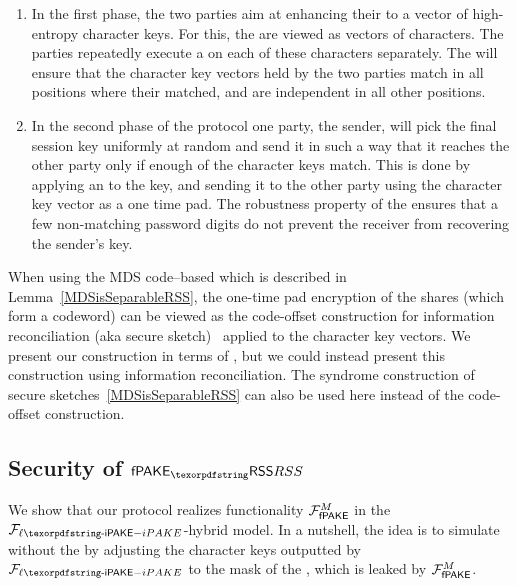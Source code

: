 

% 
\begin{enumerate}
\item 
In the first phase, the two parties aim at enhancing their \passwords to a vector of high-entropy character keys. 
For this, the \passwords are viewed as vectors of characters. 
The parties repeatedly execute a \PAKE on each of these characters separately. 
The \PAKE will ensure that the character key vectors held by the two parties match in all positions where their \passwords matched, and are independent in all other positions. 
\item
In the second phase of the protocol one party, the sender, will pick the final session key uniformly at random and send it in such a way that it reaches the other party only if enough of the character keys match.
This is done by applying an \RSS to the key, and sending it to the other party using the character key vector as a one time pad.
The robustness property of the \RSS ensures that a few non-matching password digits do not prevent the receiver from recovering the sender's key.
\end{enumerate}

When using the MDS code--based \RSS which is described in Lemma~\ref{MDSisSeparableRSS}, the one-time pad encryption of the shares (which form a codeword) can be viewed as the code-offset construction for information reconciliation (aka secure sketch)~\cite{CCS:JueWat99,EC:DodReySmi04} applied to the character key vectors. 
We present our construction in terms of \RSS, but we could instead present this construction using information reconciliation. 
The syndrome construction of secure sketches~\ref{MDSisSeparableRSS} can also be used here instead of the code-offset construction.

\subsection{Security of {$\PfakeRSS$}}\label{sec:secrssfpake}
We show that our protocol realizes functionality $\mathcal{F}_\textsf{fPAKE}^M$ in the $\Flipake$-hybrid model. In a nutshell, the idea is to simulate without the \passwords by adjusting the character keys outputted by $\Flipake$ to the mask of the \passwords, which is leaked by $\mathcal{F}_\textsf{fPAKE}^M$. 

